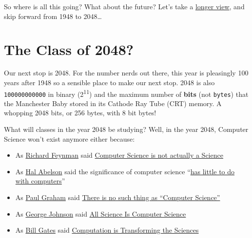 \documentclass[
  12pt,
]{book}
\providecommand{\tightlist}{%
  \setlength{\itemsep}{0pt}\setlength{\parskip}{0pt}}
\begin{document}
So where is all this going? What about the future? Let's take a \href{https://en.wikipedia.org/wiki/Long_Now_Foundation}{longer view}, and skip forward from 1948 to 2048\ldots{}

\hypertarget{y2048}{%
\section{The Class of 2048?}\label{y2048}}

Our next stop is 2048. For the number nerds out there, this year is pleasingly 100 years after 1948 so a sensible place to make our next stop. 2048 is also \texttt{100000000000} in binary (2\textsuperscript{11}) and the maximum number of \textbf{bits} (not \texttt{bytes}) that the Manchester Baby stored in its Cathode Ray Tube (CRT) memory. A whopping 2048 bits, or 256 bytes, with 8 bit bytes! \citep{kilburnphd}

What will classes in the year 2048 be studying? Well, in the year 2048, Computer Science won't exist anymore either because:

\begin{itemize}
\tightlist
\item
  As \href{https://en.wikipedia.org/wiki/Richard_Feynman}{Richard Feynman} said \href{https://www.flickr.com/photos/dullhunk/51956613478/}{Computer Science is not actually a Science} \citep{feynmanfysics}
\item
  As \href{https://en.wikipedia.org/wiki/Hal_Abelson}{Hal Abelson} said the significance of computer science ``\href{https://mitpress.mit.edu/sites/default/files/sicp/full-text/book/book-Z-H-7.html}{has little to do with computers}'' \citep{abelson}
\item
  As \href{https://en.wikipedia.org/wiki/Paul_Graham_(programmer)}{Paul Graham} said \href{http://www.paulgraham.com/hp.html}{There is no such thing as ``Computer Science''} \citep{bloggersandpainters, hackersandpainters}
\item
  As \href{https://en.wikipedia.org/wiki/George_Johnson_\%28writer\%29}{George Johnson} said \href{https://www.nytimes.com/2001/03/25/weekinreview/the-world-in-silica-fertilization-all-science-is-computer-science.html}{All Science Is Computer Science} \citep{georgejohnson}
\item
  As \href{https://en.wikipedia.org/wiki/Bill_Gates}{Bill Gates} said \href{https://web.archive.org/web/20080221053710/https://www.microsoft.com/presspass/exec/billg/speeches/2005/11-15SuperComputing05.aspx}{Computation is Transforming the Sciences} \citep{gatescompute}
\end{itemize}
\end{document}
